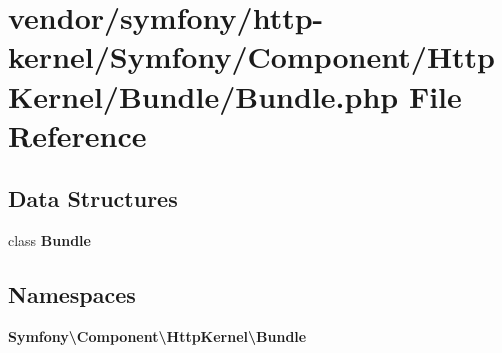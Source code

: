 \section{vendor/symfony/http-\/kernel/\+Symfony/\+Component/\+Http\+Kernel/\+Bundle/\+Bundle.php File Reference}
\label{_bundle_8php}
\subsection*{Data Structures}
\begin{DoxyCompactItemize}
\item 
class {\bf Bundle}
\end{DoxyCompactItemize}
\subsection*{Namespaces}
\begin{DoxyCompactItemize}
\item 
 {\bf Symfony\textbackslash{}\+Component\textbackslash{}\+Http\+Kernel\textbackslash{}\+Bundle}
\end{DoxyCompactItemize}
